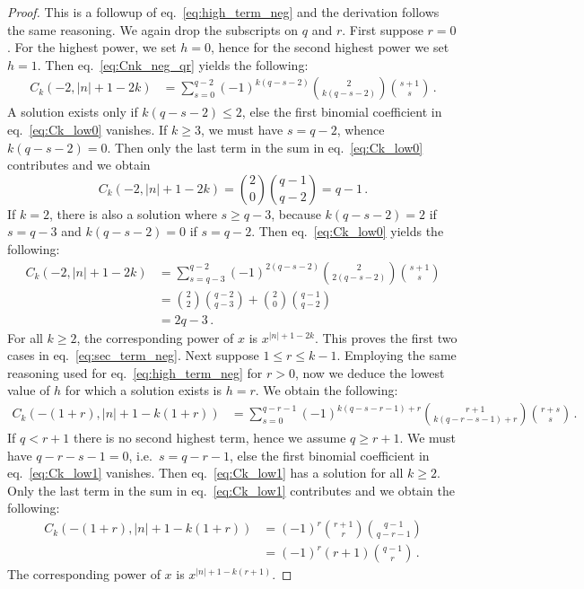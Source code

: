 \documentclass[10pt,a4paper]{amsart}
\begin{document}
\begin{proof}
This is a followup of eq.~\eqref{eq:high_term_neg} and the derivation follows the same reasoning.
We again drop the subscripts on $q$ and $r$.
First suppose $r=0$.
For the highest power, we set $h=0$, hence for the second highest power we set $h=1$.
Then eq.~\eqref{eq:Cnk_neg_qr} yields the following:
\begin{equation}
\label{eq:Ck_low0}
\begin{split}
  C_k(-2,|n|+1-2k) &= \sum_{s=0}^{q-2} (-1)^{k(q-s-2)} \binom{2}{k(q-s-2)} \binom{s+1}{s} \,.
\end{split}
\end{equation}
A solution exists only if $k(q-s-2)\le2$, else the first binomial coefficient in eq.~\eqref{eq:Ck_low0} vanishes.
If $k\ge3$, we must have $s=q-2$, whence $k(q-s-2)=0$.
Then only the last term in the sum in eq.~\eqref{eq:Ck_low0} contributes and we obtain %
\begin{equation}
C_k(-2,|n|+1-2k) = \binom{2}{0} \binom{q-1}{q-2} = q-1 \,.
\end{equation}
If $k=2$, there is also a solution where $s\ge q-3$, because $k(q-s-2) = 2$ if $s=q-3$ and $k(q-s-2) = 0$ if $s=q-2$. 
Then eq.~\eqref{eq:Ck_low0} yields the following:
\begin{equation}
\begin{split}
  C_k(-2,|n|+1-2k) &= \sum_{s=q-3}^{q-2} (-1)^{2(q-s-2)} \binom{2}{2(q-s-2)} \binom{s+1}{s}
  \\
  &= \binom{2}{2} \binom{q-2}{q-3} + \binom{2}{0} \binom{q-1}{q-2}
  \\
  &= 2q-3 \,.
\end{split}
\end{equation}
For all $k\ge2$, the corresponding power of $x$ is $x^{|n|+1-2k}$.
This proves the first two cases in eq.~\eqref{eq:sec_term_neg}.
Next suppose $1 \le r \le k-1$. 
Employing the same reasoning used for eq.~\eqref{eq:high_term_neg} for $r>0$,
now we deduce the lowest value of $h$ for which a solution exists is $h=r$. We obtain the following:
\begin{equation}
\label{eq:Ck_low1}
\begin{split}
  C_k(-(1+r),|n|+1-k(1+r)) &= \sum_{s=0}^{q-r-1} (-1)^{k(q-s-r-1)+r} %
  \binom{r+1}{k(q-r-s-1)+r} \binom{r+s}{s} \,.
\end{split}
\end{equation}
If $q<r+1$ there is no second highest term, hence we assume $q\ge r+1$.
We must have $q-r-s-1=0$, i.e.~$s=q-r-1$, else the first binomial coefficient in eq.~\eqref{eq:Ck_low1} vanishes.
Then eq.~\eqref{eq:Ck_low1} has a solution for all $k\ge2$.
Only the last term in the sum in eq.~\eqref{eq:Ck_low1} contributes and we obtain the following:
\begin{equation}
\begin{split}
  C_k(-(1+r),|n|+1-k(1+r)) &= (-1)^r \binom{r+1}{r} \binom{q-1}{q-r-1}
  \\
  &= (-1)^r (r+1) \binom{q-1}{r} \,.
\end{split}
\end{equation}
The corresponding power of $x$ is $x^{|n|+1-k(r+1)}$.
\end{proof}
\end{document}
